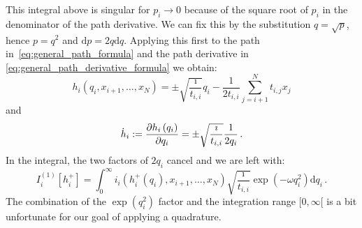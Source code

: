 \documentclass[a4paper,10pt]{article}
\begin{document}
This integral above is singular for $p_i \rightarrow 0$ because of
the square root of $p_i$ in the denominator of the path derivative.
We can fix this by the substitution $q = \sqrt{p}$, hence $p = q^2$
and $\mathrm{d}p = 2 q \mathrm{d}q$. Applying this first to the path
in~\eqref{eq:general_path_formula} and the path derivative in
\eqref{eq:general_path_derivative_formula} we obtain:
\begin{equation}
  h_i\left(q_i, x_{i+1}, \ldots, x_N\right)
  =
  \pm \sqrt{\frac{\imath}{t_{i,i}}} q_i
  -\frac{1}{2 t_{i,i}} \sum_{j=i+1}^{N} t_{i,j} x_j
\end{equation}
and
\begin{equation}
  \dot{h}_i := \frac{\partial h_i\left(q_i\right)}{\partial q_i}
  = \pm \sqrt{\frac{\imath}{t_{i,i}}} \frac{1}{2 q_i} \,.
\end{equation}
In the integral, the two factors of $2 q_i$ cancel and we are
left with:
\begin{equation}
  I_i^{(1)}[h_i^{+}] =
  \int_0^\infty
    i_i\left(h_i^{+}\left(q_i\right), x_{i+1},\ldots,x_N\right)
    \sqrt{\frac{\imath}{t_{i,i}}}
    \exp\left(- \omega q_i^2\right)
  \mathrm{d}q_i \,.
\end{equation}
The combination of the $\exp(q_i^2)$ factor and the integration range
$[0, \infty[$ is a bit unfortunate for our goal of applying a quadrature.
\end{document}
